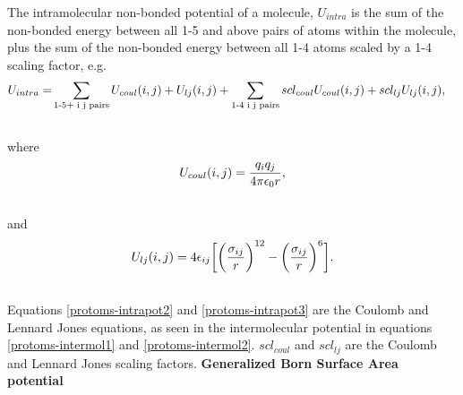 \documentclass[letterpaper,10pt,english]{manual}
\begin{document}
The intramolecular non-bonded potential of a molecule, $U_{intra}$ is the sum of the non-bonded energy between all 1-5 and above pairs of atoms within the molecule, plus the sum of the non-bonded energy between all 1-4 atoms scaled by a 1-4 scaling factor, e.g.
\hypertarget{equation-intrapot1}{}\begin{gather}
\begin{split}U_{intra} = &\sum_{\text{1-5+ i j pairs}} U_{coul}(i,j) + U_{lj}(i,j) + \sum_{\text{1-4 i j pairs}} scl_{coul} U_{coul}(i,j) + scl_{lj} U_{lj}(i,j),\end{split}\label{protoms-intrapot1}\\\begin{split}\end{split}\notag
\end{gather}
where
\hypertarget{equation-intrapot2}{}\begin{gather}
\begin{split}U_{coul}(i,j) = \frac{q_i q_j}{4\pi\epsilon_{0} r},\end{split}\label{protoms-intrapot2}\\\begin{split}\end{split}\notag
\end{gather}
and
\hypertarget{equation-intrapot3}{}\begin{gather}
\begin{split}U_{lj}(i,j) = 4\epsilon_{ij}\biggl[ \biggl(\frac{\sigma_{ij}}{r}\biggr)^{12} - \biggl(\frac{\sigma_{ij}}{r}\biggr)^6 \biggr].\end{split}\label{protoms-intrapot3}\\\begin{split}\end{split}\notag
\end{gather}
Equations \eqref{protoms-intrapot2} and \eqref{protoms-intrapot3} are the Coulomb and Lennard Jones equations, as seen in the intermolecular potential in equations \eqref{protoms-intermol1} and \eqref{protoms-intermol2}. $scl_{coul}$ and $scl_{lj}$ are the Coulomb and Lennard Jones scaling factors.
\textbf{Generalized Born Surface Area potential}
\end{document}
